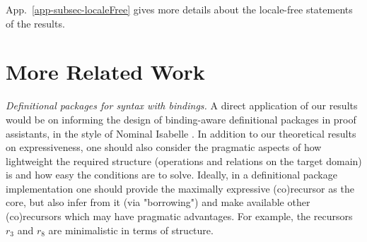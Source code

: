 App.~\ref{app-subsec-localeFree} 
gives more details about the locale-free statements of the results. %





\section{%
	More Related Work}
\label{sec-relWork} 



\indent 
\hspace*{2ex}
\textit{Definitional packages for syntax with bindings.} 
A direct application of our results would be on informing the 
design of binding-aware definitional packages in proof assistants, in the style of  Nominal Isabelle \cite{nominalTwo}. %
In addition to our theoretical results on expressiveness,  %
one should also consider the pragmatic aspects of how lightweight the required structure (operations and relations on the target domain) is and how easy the conditions are to solve. Ideally, in a definitional package implementation one should provide %
the maximally expressive (co)recursor as the core, but also infer from it (via "borrowing") and make available other (co)recursors which may have pragmatic advantages. For example, the recursors $r_3$ and $r_8$ 
are minimalistic in terms of structure. %



